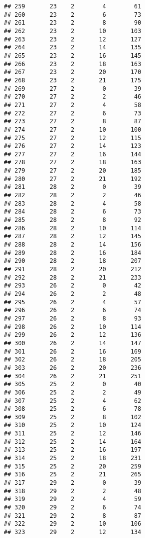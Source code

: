 \documentclass[
]{article}
\begin{document}
\begin{verbatim}
## 259       23    2        4        61
## 260       23    2        6        73
## 261       23    2        8        90
## 262       23    2       10       103
## 263       23    2       12       127
## 264       23    2       14       135
## 265       23    2       16       145
## 266       23    2       18       163
## 267       23    2       20       170
## 268       23    2       21       175
## 269       27    2        0        39
## 270       27    2        2        46
## 271       27    2        4        58
## 272       27    2        6        73
## 273       27    2        8        87
## 274       27    2       10       100
## 275       27    2       12       115
## 276       27    2       14       123
## 277       27    2       16       144
## 278       27    2       18       163
## 279       27    2       20       185
## 280       27    2       21       192
## 281       28    2        0        39
## 282       28    2        2        46
## 283       28    2        4        58
## 284       28    2        6        73
## 285       28    2        8        92
## 286       28    2       10       114
## 287       28    2       12       145
## 288       28    2       14       156
## 289       28    2       16       184
## 290       28    2       18       207
## 291       28    2       20       212
## 292       28    2       21       233
## 293       26    2        0        42
## 294       26    2        2        48
## 295       26    2        4        57
## 296       26    2        6        74
## 297       26    2        8        93
## 298       26    2       10       114
## 299       26    2       12       136
## 300       26    2       14       147
## 301       26    2       16       169
## 302       26    2       18       205
## 303       26    2       20       236
## 304       26    2       21       251
## 305       25    2        0        40
## 306       25    2        2        49
## 307       25    2        4        62
## 308       25    2        6        78
## 309       25    2        8       102
## 310       25    2       10       124
## 311       25    2       12       146
## 312       25    2       14       164
## 313       25    2       16       197
## 314       25    2       18       231
## 315       25    2       20       259
## 316       25    2       21       265
## 317       29    2        0        39
## 318       29    2        2        48
## 319       29    2        4        59
## 320       29    2        6        74
## 321       29    2        8        87
## 322       29    2       10       106
## 323       29    2       12       134

\end{verbatim}
\end{document}
